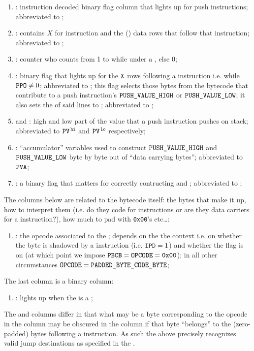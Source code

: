 \begin{enumerate}[resume]
    \item \IP{}:
	instruction decoded binary flag column that lights up for push instructions;
	abbreviated to \ip{};
    \item \PP{}:
	contains $X$ for  instruction and the () data rows that follow that instruction;
	abbreviated to \pp{};
    \item \CP{}:
	counter who counts from 1 to \PP{} while under a , else 0;
    \item \IPD{}:
	binary flag that lights up for the $\texttt{X}$ rows following a  instruction i.e. while $\texttt{PPO}{} \neq 0$;
	abbreviated to \ipd{};
	this flag selects those bytes from the bytecode that contribute to a push instruction's $\texttt{PUSH\_VALUE}\texttt{\_HIGH}$ or $\texttt{PUSH\_VALUE}\texttt{\_LOW}$;
	it also sets the \opc{} of said lines to ;
	abbreviated to \ipd{};
    \item \PV\HIGH{} and \PV\LOW{}:
	high and low part of the value that a push instruction pushes on stack;
	abbreviated to $\texttt{PV}^{\mathtt{\,hi}}$ and $\texttt{PV}^{\mathtt{\,lo}}$ respectively;
    \item \PVA:
	``accumulator'' variables used to construct $\texttt{PUSH\_VALUE}\texttt{\_HIGH}$ and $\texttt{PUSH\_VALUE}\texttt{\_LOW}$ byte by byte out of ``data carrying bytes'';
	abbreviated to $\texttt{PVA}$;
    \item \PFB{}:
	a binary flag that matters for correctly contructing \PV\HIGH{} and \PV\LOW{};
	abbreviated to \pfb{};
\end{enumerate}

The columns below are related to the bytecode itself: the bytes that make it up, how to interpret them (i.e. do they code for instructions or are they data carriers for a  instruction?), how much to pad with \texttt{0x00}'s etc\dots:
\begin{enumerate}[resume]
    \item \opc{}:
	the opcode associated to the \pbcb{};
	depends on the the context i.e. on whether the byte is shadowed by a  instruction (i.e. \( \texttt{IPD}{}=1 \)) and whether the \CSR{} flag is on (at which point we impose $\texttt{PBCB}=\texttt{OPCODE}=\texttt{0x00}$);
	in all other circumstances \( \texttt{OPCODE}{} = \texttt{PADDED\_BYTE\_CODE\_BYTE}{} \);
\end{enumerate}

The last column is a binary column:
\begin{enumerate}[resume]
    \item \ISVALIDJUMPDESTINATION{}:
	lights up when the \opc{} is a ;
\end{enumerate}
\saNote{}
The \opc{} and \pbcb{} columns differ in that what may be a byte corresponding to the  opcode in the \pbcb{} column may be obscured in the \opc{} column if that byte ``belongs'' to the  (zero-padded) bytes following a  instruction.
As such the above precisely recognizes valid jump destinations as specified in the \cite{EYP-London}.
